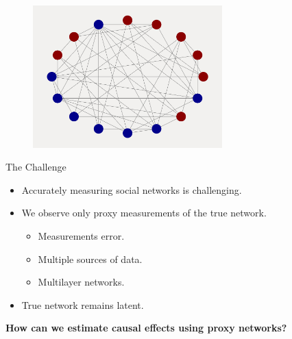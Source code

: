 \documentclass{beamer}
\begin{document}
    \begin{frame}[t]
        \begin{figure}[t]
            \centering
            \includegraphics[width=0.65\textwidth]{figs/connected_net.png}
        \end{figure}
    \end{frame}

    \begin{frame}{The Challenge}
        \large
        \begin{itemize}
            \item<1-> Accurately measuring social networks is challenging.
            \vspace{0.2cm}
            \item<1-> We observe only proxy measurements of the true network.
            \begin{itemize}
                \item Measurements error.
                \item Multiple sources of data.
                \item Multilayer networks.
            \end{itemize}
            \vspace{0.2cm}
            \item<1-> True network remains latent.
        \end{itemize}
        \vspace{.5cm}
        \pause
        \begin{center}
            \Large
            \textbf{How can we estimate causal effects using proxy networks?}
        \end{center}
    \end{frame}
\end{document}
